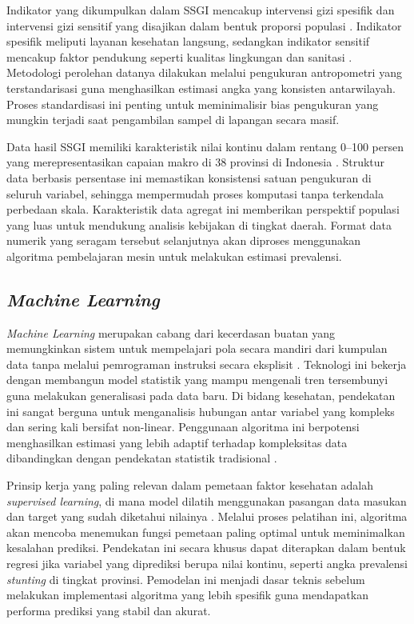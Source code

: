 Indikator yang dikumpulkan dalam SSGI mencakup intervensi gizi spesifik dan intervensi gizi sensitif yang disajikan dalam bentuk proporsi populasi \cite{kemenkes2025ssgi}. Indikator spesifik meliputi layanan kesehatan langsung, sedangkan indikator sensitif mencakup faktor pendukung seperti kualitas lingkungan dan sanitasi \cite{kemenkes2025ssgi}. Metodologi perolehan datanya dilakukan melalui pengukuran antropometri yang terstandarisasi guna menghasilkan estimasi angka yang konsisten antarwilayah. Proses standardisasi ini penting untuk meminimalisir bias pengukuran yang mungkin terjadi saat pengambilan sampel di lapangan secara masif.

Data hasil SSGI memiliki karakteristik nilai kontinu dalam rentang 0--100 persen yang merepresentasikan capaian makro di 38 provinsi di Indonesia \cite{kemenkes2025ssgi}. Struktur data berbasis persentase ini memastikan konsistensi satuan pengukuran di seluruh variabel, sehingga mempermudah proses komputasi tanpa terkendala perbedaan skala. Karakteristik data agregat ini memberikan perspektif populasi yang luas untuk mendukung analisis kebijakan di tingkat daerah. Format data numerik yang seragam tersebut selanjutnya akan diproses menggunakan algoritma pembelajaran mesin untuk melakukan estimasi prevalensi.

\subsection{\textit{Machine Learning}}

\textit{Machine Learning} merupakan cabang dari kecerdasan buatan yang memungkinkan sistem untuk mempelajari pola secara mandiri dari kumpulan data tanpa melalui pemrograman instruksi secara eksplisit \cite{id2021machine}. Teknologi ini bekerja dengan membangun model statistik yang mampu mengenali tren tersembunyi guna melakukan generalisasi pada data baru. Di bidang kesehatan, pendekatan ini sangat berguna untuk menganalisis hubungan antar variabel yang kompleks dan sering kali bersifat non-linear. Penggunaan algoritma ini berpotensi menghasilkan estimasi yang lebih adaptif terhadap kompleksitas data dibandingkan dengan pendekatan statistik tradisional \cite{id2021machine}.

Prinsip kerja yang paling relevan dalam pemetaan faktor kesehatan adalah \textit{supervised learning}, di mana model dilatih menggunakan pasangan data masukan dan target yang sudah diketahui nilainya \cite{id2021machine}. Melalui proses pelatihan ini, algoritma akan mencoba menemukan fungsi pemetaan paling optimal untuk meminimalkan kesalahan prediksi. Pendekatan ini secara khusus dapat diterapkan dalam bentuk regresi jika variabel yang diprediksi berupa nilai kontinu, seperti angka prevalensi \textit{stunting} di tingkat provinsi. Pemodelan ini menjadi dasar teknis sebelum melakukan implementasi algoritma yang lebih spesifik guna mendapatkan performa prediksi yang stabil dan akurat.

